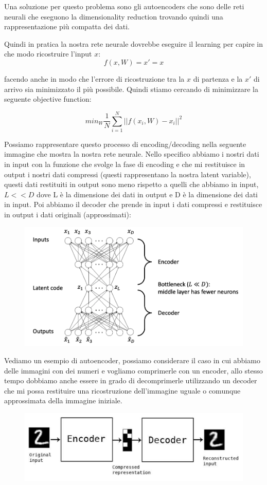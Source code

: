 \documentclass[14pt]{extreport}
\begin{document}
Una soluzione per questo problema sono gli autoencoders che sono delle reti neurali che eseguono la dimensionality reduction trovando quindi una
rappresentazione più compatta dei dati.

Quindi in pratica la nostra rete neurale dovrebbe eseguire il learning per capire in che modo ricostruire l'input $x$:
$$f(x,W) = x' = x$$

facendo anche in modo che l'errore di ricostruzione tra la $x$ di partenza e la $x'$ di arrivo sia minimizzato il più possibile. Quindi stiamo
cercando di minimizzare la seguente objective function:

$$min_W \frac{1}{N} \sum_{i=1}^N ||f(x_i, W)-x_i||^2$$

Possiamo rappresentare questo processo di encoding/decoding nella seguente immagine che mostra la nostra rete neurale. Nello specifico abbiamo i
nostri dati in input con la funzione che svolge la fase di encoding e che mi restituisce in output i nostri dati compressi (questi rappresentano la
nostra latent variable), questi dati restituiti in output sono meno rispetto a quelli che abbiamo in input, $L << D$ dove L è la dimensione dei dati
in output e D è la dimensione dei dati in input. Poi abbiamo il decoder che prende in input i dati compressi e restituisce in output i dati originali
(approssimati):

\begin{figure}[H]
	\centering
	\includegraphics[width=0.7\linewidth]{533.jpeg}
\end{figure}

Vediamo un esempio di autoencoder, possiamo considerare il caso in cui abbiamo delle immagini con dei numeri e vogliamo comprimerle con un encoder,
allo stesso tempo dobbiamo anche essere in grado di decomprimerle utilizzando un decoder che mi possa restituire una ricostruzione dell'immagine
uguale o comunque approssimata della immagine iniziale.


\begin{figure}[H]
	\centering
	\includegraphics[width=0.7\linewidth]{534.jpeg}
\end{figure}
\end{document}
